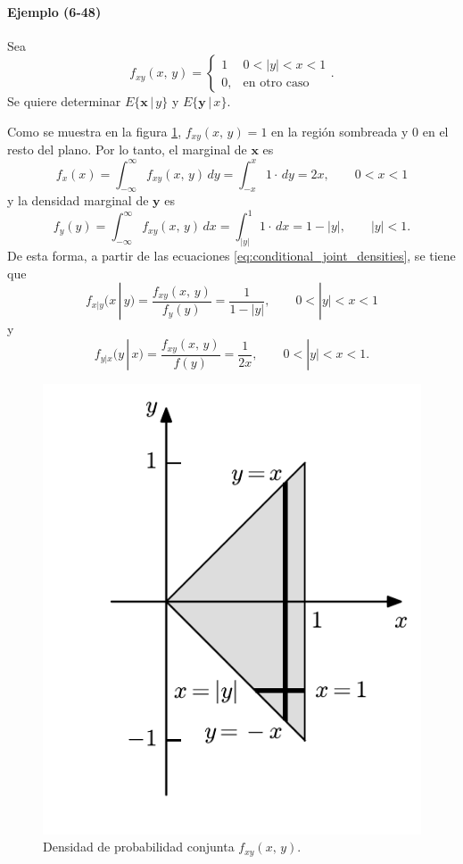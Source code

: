 \documentclass[a4paper]{report}
\newcommand{\x}{\mathbf{x}}
\newcommand{\y}{\mathbf{y}}
\begin{document}
\paragraph{Ejemplo (6-48)} Sea
\[
 f_{xy}(x,\,y)
 =\left\{\begin{array}{ll}
   1 & 0<|y|<x<1\\ 
   0, & \textrm{en otro caso}
 \end{array} \right..
\]
Se quiere determinar \(E\{\x\,|\,y\}\) y \(E\{\y\,|\,x\}\).

Como se muestra en la figura \ref{fig:conditional_means_example}, \(f_{xy}(x,\,y)=1\) en la región sombreada y 0 en el resto del plano. Por lo tanto, el marginal de \(\x\) es
\[
 f_x(x)=\int_{-\infty}^{\infty}f_{xy}(x,\,y)\,dy = \int_{-x}^{x}1\cdot\,dy=2x,\qquad 0<x<1
\]
y la densidad marginal de \(\y\) es
\[
 f_y(y)=\int_{-\infty}^{\infty}f_{xy}(x,\,y)\,dx = \int_{|y|}^{1}1\cdot\,dx=1-|y|,\qquad |y|<1.
\]
De esta forma, a partir de las ecuaciones \ref{eq:conditional_joint_densities}, se tiene que
\[
 f_{x|y}(x\,|\,y)=\frac{f_{xy}(x,\,y)}{f_y(y)}=\frac{1}{1-|y|},\qquad 0<|y|<x<1
\]
y
\[
 f_{y|x}(y\,|\,x)=\frac{f_{xy}(x,\,y)}{f(y)}=\frac{1}{2x},\qquad 0<|y|<x<1.
\]
\begin{figure}[!htb]
  \begin{minipage}[c]{0.4\textwidth}
    \includegraphics[width=\textwidth]{figuras/conditional_means_example.pdf}
  \end{minipage}\hfill
  \begin{minipage}[c]{0.57\textwidth}
    \caption{
       Densidad de probabilidad conjunta \(f_{xy}(x,\,y)\).
    } \label{fig:conditional_means_example}
  \end{minipage}
\end{figure}
\end{document}
